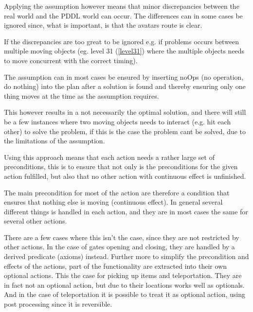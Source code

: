 		Applying the assumption however means that minor discrepancies between the real world and the PDDL world can occur. The differences can in some cases be ignored since, what is important, is that the avatars route is clear. 

		If the discrepancies are too great to be ignored e.g. if problems occurs between multiple moving objects (eg. level 31 (\ref{level31}) where the multiple objects needs to move concurrent with the correct timing). 

		The assumption can in most cases be ensured by inserting noOps (no operation, do nothing) into the plan after a solution is found and thereby ensuring only one thing moves at the time as the assumption requires. 

		This however results in a not necessarily the optimal solution, and there will still be a few instances where two moving objects needs to interact (e.g. hit each other) to solve the problem, if this is the case the problem cant be solved, due to the limitations of the assumption.
			
		Using this approach means that each action needs a rather large set of preconditions, this is to ensure that not only is the preconditions for the given action fulfilled, but also that no other action with continuous effect is unfinished. 

		The main precondition for most of the action are therefore a condition that ensures that nothing else is moving (continuous effect). In general several different things is handled in each action, and they are in most cases the same for several other actions. %
		
		There are a few cases where this isn't the case, since they are not restricted by other actions. In the case of gates opening and closing, they are handled by a derived predicate (axioms) instead. 
		Further more to simplify the precondition and effects of the actions, part of the functionality are extracted into their own optional actions. This the case for picking up items and teleportation. They are in fact not an optional action, but due to their locations works well as optionals. And in the case of teleportation it is possible to treat it as optional action, using post processing since it is reversible.
		
